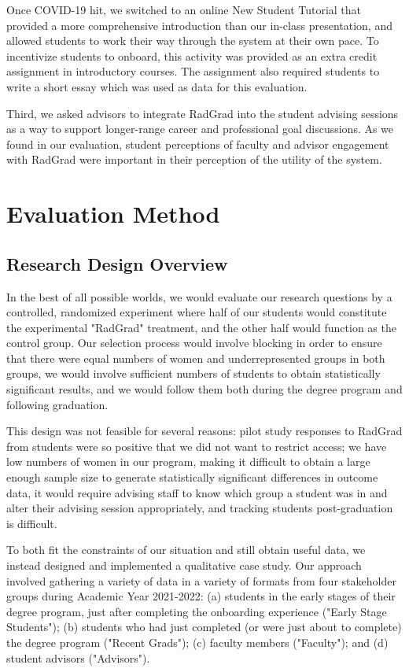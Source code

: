 \documentclass[acmsmall,nonacm]{acmart}
\begin{document}
Once COVID-19 hit, we switched to an online New Student Tutorial that provided a more comprehensive introduction than our in-class presentation, and allowed students to work their way through the system at their own pace.  To incentivize students to onboard, this activity was provided as an extra credit assignment in introductory courses.  The assignment also required students to write a short essay which was used as data for this evaluation.

Third, we asked advisors to integrate RadGrad into the student advising sessions as a way to support longer-range career and professional goal discussions.  As we found in our evaluation, student perceptions of faculty and advisor engagement with RadGrad were important in their perception of the utility of the system.

\section{Evaluation Method}
\label{sec:method}

\subsection{Research Design Overview}

In the best of all possible worlds, we would evaluate our research questions by a controlled, randomized experiment where half of our students would constitute the experimental "RadGrad" treatment, and the other half would function as the control group.  Our selection process would involve blocking in order to ensure that there were equal numbers of women and underrepresented groups in both groups, we would involve sufficient numbers of students to obtain statistically significant results, and we would follow them both during the degree program and following graduation.

This design was not feasible for several reasons: pilot study responses to RadGrad from students were so positive that we did not want to restrict access; we have low numbers of women in our program, making it difficult to obtain a large enough sample size to generate statistically significant differences in outcome data, it would require advising staff to know which group a student was in and alter their advising session appropriately, and tracking students post-graduation is difficult.

To both fit the constraints of our situation and still obtain useful data, we instead designed and implemented a qualitative case study. Our approach involved gathering a variety of data in a variety of formats from four stakeholder groups during Academic Year 2021-2022: (a) students in the early stages of their degree program, just after completing the onboarding experience ("Early Stage Students"); (b) students who had just completed (or were just about to complete) the degree program ("Recent Grads"); (c) faculty members ("Faculty"); and (d) student advisors ("Advisors").
\end{document}
